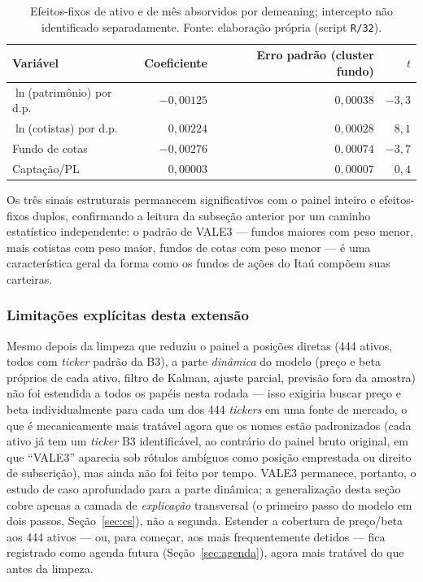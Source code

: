 \documentclass[12pt,a4paper]{article}
\begin{document}
\begin{table}[h]\centering\small
\caption{Regressão pooled multiativo com efeito-fixo de ativo e de mês (894.551
observações, 444 ativos, 305 fundos, 72 meses).}
\label{tab:fe2way}
\begin{tabular}{@{}lrrr@{}}
\toprule
Variável & Coeficiente & Erro padrão (cluster fundo) & $t$ \\
\midrule
$\ln$(patrimônio) por d.p. & $-0{,}00125$ & $0{,}00038$ & $-3{,}3$ \\
$\ln$(cotistas) por d.p.   & $0{,}00224$  & $0{,}00028$ & $8{,}1$ \\
Fundo de cotas             & $-0{,}00276$ & $0{,}00074$ & $-3{,}7$ \\
Captação/PL                & $0{,}00003$  & $0{,}00007$ & $0{,}4$ \\
\bottomrule
\end{tabular}
\caption*{\footnotesize Efeitos-fixos de ativo e de mês absorvidos por demeaning; intercepto não
identificado separadamente. Fonte: elaboração própria (script \texttt{R/32}).}
\end{table}

Os três sinais estruturais permanecem significativos com o painel inteiro e efeitos-fixos
duplos, confirmando a leitura da subseção anterior por um caminho estatístico independente: o
padrão de VALE3 --- fundos maiores com peso menor, mais cotistas com peso maior, fundos de cotas
com peso menor --- é uma característica geral da forma como os fundos de ações do Itaú compõem
suas carteiras.

\subsubsection{Limitações explícitas desta extensão}

Mesmo depois da limpeza que reduziu o painel a posições diretas (444 ativos, todos com
\emph{ticker} padrão da B3), a parte \emph{dinâmica} do modelo (preço e beta próprios de cada
ativo, filtro de Kalman, ajuste parcial, previsão fora da amostra) não foi estendida a todos os
papéis nesta rodada --- isso exigiria buscar preço e beta individualmente para cada um dos 444
\emph{tickers} em uma fonte de mercado, o que é mecanicamente mais tratável agora que os nomes
estão padronizados (cada ativo já tem um \emph{ticker} B3 identificável, ao contrário do painel
bruto original, em que ``VALE3'' aparecia sob rótulos ambíguos como posição emprestada ou direito
de subscrição), mas ainda não foi feito por tempo. VALE3 permanece, portanto, o estudo de caso
aprofundado para a parte dinâmica; a generalização desta seção cobre apenas a camada de
\emph{explicação} transversal (o primeiro passo do modelo em dois passos, Seção~\ref{sec:cs}),
não a segunda. Estender a cobertura de preço/beta aos 444 ativos --- ou, para começar, aos mais
frequentemente detidos --- fica registrado como agenda futura (Seção~\ref{sec:agenda}), agora
mais tratável do que antes da limpeza.
\end{document}
